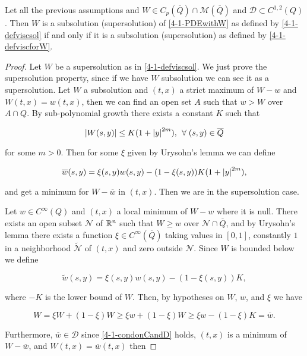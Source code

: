 \begin{theorem}
    Let all the previous assumptions and $W\in C_p(\overline{Q})\cap\mathcal{M}(\overline{Q})$ and $\mathcal{D}\subset C^{1,2}(Q)$. Then $W$ is a subsolution (supersolution) 
    of \ref{4-1-PDEwithW} as defined by \ref{4-1-defviscsol} if and only if it is a subsolution (supersolution) as defined by \ref{4-1-defviscforW}. 

    \begin{proof}
        Let $W$ be a supersolution as in \ref{4-1-defviscsol}. We just prove the supersolution property, since if we have $W$ subsolution we can see it as 
        a supersolution. Let $W$ a subsolution and $(t,x)$ a strict maximum of $W-w$ and $W(t,x)=w(t,x)$, then we can find an open set $A$ such that $w>W$ over 
        $A\cap Q$. By sub-polynomial growth there exists a constant $K$ such that 

        \[\abs{W(s,y)} \leq K(1+\abs{y}^{2m}),\,\forall (s,y)\in\overline{Q}\]

        for some $m>0$. Then for some $\xi$ given by Urysohn’s lemma we can define 

        \[\overline{w}(s,y)= \xi(s,y)w(s,y) - (1-\xi(s,y))K(1+\abs{y}^{2m}),\]

        and get a minimum for $W-\overline{w}$ in $(t,x)$. Then we are in the supersolution case.

        Let $w\in C^{\infty}(Q)$ and $(t,x)$ a local minimum of $W-w$ where it is null. There exists an open subset $\mathcal{N}$ of $\mathbb{R}^n$ such that 
        $W\geq w$ over $\mathcal{N}\cap\overline{Q}$, and by Urysohn’s lemma there exists a function $\xi\in C^{\infty}(\overline{Q})$ taking values in $[0,1]$, 
        constantly $1$ in a neighborhood $\tilde{\mathcal{N}}$ of $(t,x)$ and zero outside $\mathcal{N}$. Since $W$ is bounded below we define 
        
        \begin{equation}
            \tilde{w}(s,y) = \xi(s,y)w(s,y) - (1-\xi(s,y))K,
        \end{equation}

        where $-K$ is the lower bound of $W$. Then, by hypotheses on $W$, $w$, and $\xi$ we have

        \[W = \xi W  + (1-\xi) W \geq \xi w + (1-\xi)W\geq\xi w-(1-\xi)K=\overline{w}.\]

        Furthermore, $\overline{w}\in\mathcal{D}$ since \ref{4-1-condonCandD} holds, $(t,x)$ is a minimum of $W-\overline{w}$, and $W(t,x)=\overline{w}(t,x)$ 
        then 
        

\end{proof}
\end{theorem}
